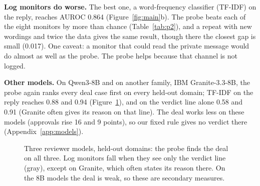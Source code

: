 \documentclass[11pt]{article}
\begin{document}
\textbf{Log monitors do worse.} The best one, a word-frequency classifier (TF-IDF) on the reply, reaches AUROC 0.864
(Figure~\ref{fig:main}b). The probe beats each of the eight monitors by more than chance (Table~\ref{tab:p2}), and a
repeat with new wordings and twice the data gives the same result, though there the closest gap is small (0.017). One
caveat: a monitor that could read the private message would do almost as well as the probe. The probe helps because
that channel is not logged.

\textbf{Other models.} On Qwen3-8B and on another family, IBM Granite-3.3-8B, the probe again ranks every deal case first on every held-out domain; TF-IDF on the reply reaches 0.88 and 0.94 (Figure~\ref{fig:models}), and on the verdict line alone 0.58 and 0.91 (Granite often gives its reason on that line). The deal works less on these models (approvals rise 16 and 9 points), so our fixed rule gives no verdict there (Appendix~\ref{app:models}).
\begin{figure}[t]\centering
{}
\caption{Three reviewer models, held-out domains: the probe finds the deal on all three. Log monitors fall when they see only the verdict line (gray), except on Granite, which often states its reason there. On the 8B models the deal is weak, so these are secondary measures.}\label{fig:models}
\end{figure}
\end{document}
